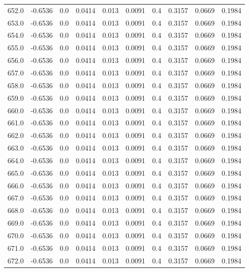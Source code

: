 \begin{longtable}{lrrrrrrrrr}
652.0 & -0.6536 & 0.0 & 0.0414 & 0.013 & 0.0091 & 0.4 & 0.3157 & 0.0669 & 0.1984 \\
653.0 & -0.6536 & 0.0 & 0.0414 & 0.013 & 0.0091 & 0.4 & 0.3157 & 0.0669 & 0.1984 \\
654.0 & -0.6536 & 0.0 & 0.0414 & 0.013 & 0.0091 & 0.4 & 0.3157 & 0.0669 & 0.1984 \\
655.0 & -0.6536 & 0.0 & 0.0414 & 0.013 & 0.0091 & 0.4 & 0.3157 & 0.0669 & 0.1984 \\
656.0 & -0.6536 & 0.0 & 0.0414 & 0.013 & 0.0091 & 0.4 & 0.3157 & 0.0669 & 0.1984 \\
657.0 & -0.6536 & 0.0 & 0.0414 & 0.013 & 0.0091 & 0.4 & 0.3157 & 0.0669 & 0.1984 \\
658.0 & -0.6536 & 0.0 & 0.0414 & 0.013 & 0.0091 & 0.4 & 0.3157 & 0.0669 & 0.1984 \\
659.0 & -0.6536 & 0.0 & 0.0414 & 0.013 & 0.0091 & 0.4 & 0.3157 & 0.0669 & 0.1984 \\
660.0 & -0.6536 & 0.0 & 0.0414 & 0.013 & 0.0091 & 0.4 & 0.3157 & 0.0669 & 0.1984 \\
661.0 & -0.6536 & 0.0 & 0.0414 & 0.013 & 0.0091 & 0.4 & 0.3157 & 0.0669 & 0.1984 \\
662.0 & -0.6536 & 0.0 & 0.0414 & 0.013 & 0.0091 & 0.4 & 0.3157 & 0.0669 & 0.1984 \\
663.0 & -0.6536 & 0.0 & 0.0414 & 0.013 & 0.0091 & 0.4 & 0.3157 & 0.0669 & 0.1984 \\
664.0 & -0.6536 & 0.0 & 0.0414 & 0.013 & 0.0091 & 0.4 & 0.3157 & 0.0669 & 0.1984 \\
665.0 & -0.6536 & 0.0 & 0.0414 & 0.013 & 0.0091 & 0.4 & 0.3157 & 0.0669 & 0.1984 \\
666.0 & -0.6536 & 0.0 & 0.0414 & 0.013 & 0.0091 & 0.4 & 0.3157 & 0.0669 & 0.1984 \\
667.0 & -0.6536 & 0.0 & 0.0414 & 0.013 & 0.0091 & 0.4 & 0.3157 & 0.0669 & 0.1984 \\
668.0 & -0.6536 & 0.0 & 0.0414 & 0.013 & 0.0091 & 0.4 & 0.3157 & 0.0669 & 0.1984 \\
669.0 & -0.6536 & 0.0 & 0.0414 & 0.013 & 0.0091 & 0.4 & 0.3157 & 0.0669 & 0.1984 \\
670.0 & -0.6536 & 0.0 & 0.0414 & 0.013 & 0.0091 & 0.4 & 0.3157 & 0.0669 & 0.1984 \\
671.0 & -0.6536 & 0.0 & 0.0414 & 0.013 & 0.0091 & 0.4 & 0.3157 & 0.0669 & 0.1984 \\
672.0 & -0.6536 & 0.0 & 0.0414 & 0.013 & 0.0091 & 0.4 & 0.3157 & 0.0669 & 0.1984 \\

\end{longtable}
